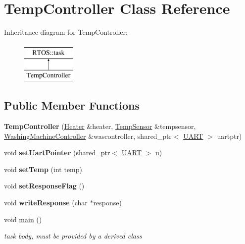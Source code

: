 \hypertarget{class_temp_controller}{}\section{Temp\+Controller Class Reference}
\label{class_temp_controller}
Inheritance diagram for Temp\+Controller\+:\begin{figure}[H]
\begin{center}
\leavevmode
\includegraphics[height=2.000000cm]{class_temp_controller}
\end{center}
\end{figure}
\subsection*{Public Member Functions}
\begin{DoxyCompactItemize}
\item 
{\bfseries Temp\+Controller} (\hyperlink{class_heater}{Heater} \&heater, \hyperlink{class_temp_sensor}{Temp\+Sensor} \&tempsensor, \hyperlink{class_washing_machine_controller}{Washing\+Machine\+Controller} \&wascontroller, shared\+\_\+ptr$<$ \hyperlink{class_u_a_r_t}{U\+A\+RT} $>$ uartptr)\hypertarget{class_temp_controller_a32ee50a0d7a6ac9cbaf779efc4ae3041}{}\label{class_temp_controller_a32ee50a0d7a6ac9cbaf779efc4ae3041}

\item 
void {\bfseries set\+Uart\+Pointer} (shared\+\_\+ptr$<$ \hyperlink{class_u_a_r_t}{U\+A\+RT} $>$ u)\hypertarget{class_temp_controller_a5341f3579b7d078d8b32560107eadfb0}{}\label{class_temp_controller_a5341f3579b7d078d8b32560107eadfb0}

\item 
void {\bfseries set\+Temp} (int temp)\hypertarget{class_temp_controller_a6ed0fe5c5e16eaeb1cf4823e629204c5}{}\label{class_temp_controller_a6ed0fe5c5e16eaeb1cf4823e629204c5}

\item 
void {\bfseries set\+Response\+Flag} ()\hypertarget{class_temp_controller_a8652d8509bf7e01e527a9a26bfc5419c}{}\label{class_temp_controller_a8652d8509bf7e01e527a9a26bfc5419c}

\item 
void {\bfseries write\+Response} (char $\ast$response)\hypertarget{class_temp_controller_a0805825500af4fd932739157174589fe}{}\label{class_temp_controller_a0805825500af4fd932739157174589fe}

\item 
void \hyperlink{class_temp_controller_a2e2a50ee8bc46aade551f39839a43baf}{main} ()
\begin{DoxyCompactList}\small\item\em task body, must be provided by a derived class \end{DoxyCompactList}\end{DoxyCompactItemize}
